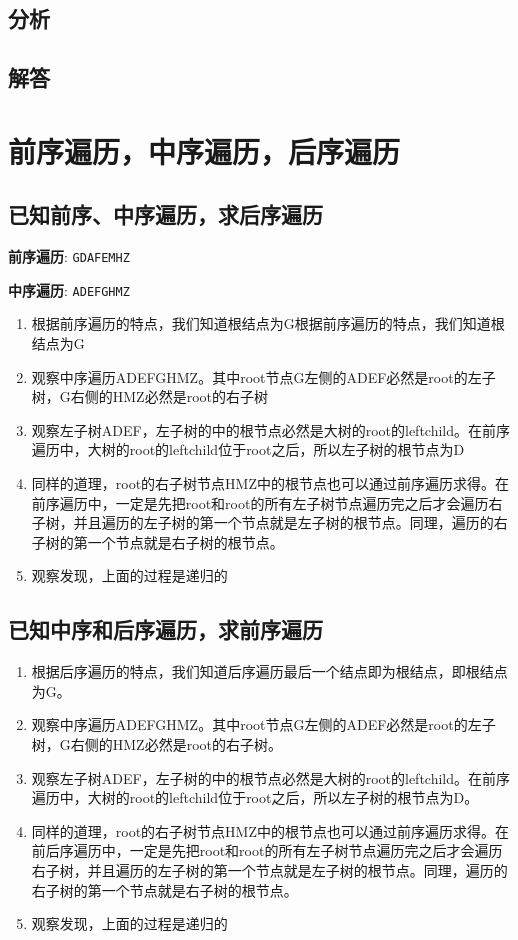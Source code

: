 \documentclass[UTF8,a4paper,12pt]{ctexbook}
\begin{document}
	\subsection{分析}
	
	\subsection{解答}
	
\section{前序遍历，中序遍历，后序遍历}
	\subsection{已知前序、中序遍历，求后序遍历}
	
		\textbf{前序遍历}: \verb|GDAFEMHZ|
		
		\textbf{中序遍历}: \verb|ADEFGHMZ|
		
		\begin{enumerate}
			\item 根据前序遍历的特点，我们知道根结点为G根据前序遍历的特点，我们知道根结点为G
			\item 观察中序遍历ADEFGHMZ。其中root节点G左侧的ADEF必然是root的左子树，G右侧的HMZ必然是root的右子树
			\item 观察左子树ADEF，左子树的中的根节点必然是大树的root的leftchild。在前序遍历中，大树的root的leftchild位于root之后，所以左子树的根节点为D
			\item 同样的道理，root的右子树节点HMZ中的根节点也可以通过前序遍历求得。在前序遍历中，一定是先把root和root的所有左子树节点遍历完之后才会遍历右子树，并且遍历的左子树的第一个节点就是左子树的根节点。同理，遍历的右子树的第一个节点就是右子树的根节点。
			\item 观察发现，上面的过程是递归的
		\end{enumerate}
	
	\subsection{已知中序和后序遍历，求前序遍历}
	
		\begin{enumerate}
			\item 根据后序遍历的特点，我们知道后序遍历最后一个结点即为根结点，即根结点为G。
			\item 观察中序遍历ADEFGHMZ。其中root节点G左侧的ADEF必然是root的左子树，G右侧的HMZ必然是root的右子树。
			\item 观察左子树ADEF，左子树的中的根节点必然是大树的root的leftchild。在前序遍历中，大树的root的leftchild位于root之后，所以左子树的根节点为D。
			\item 同样的道理，root的右子树节点HMZ中的根节点也可以通过前序遍历求得。在前后序遍历中，一定是先把root和root的所有左子树节点遍历完之后才会遍历右子树，并且遍历的左子树的第一个节点就是左子树的根节点。同理，遍历的右子树的第一个节点就是右子树的根节点。
			\item 观察发现，上面的过程是递归的
		\end{enumerate}
	
\end{document}
